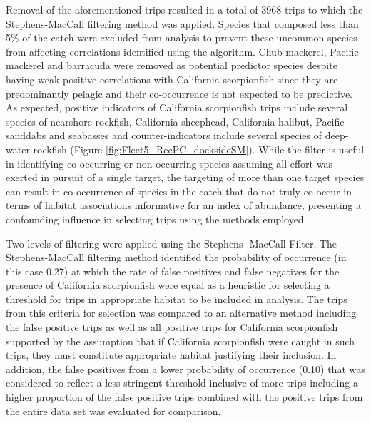 \documentclass[12pt,]{article}
\begin{document}
Removal of the aforementioned trips resulted in a total of 3968 trips to
which the Stephens-MacCall filtering method was applied. Species that
composed less than 5\% of the catch were excluded from analysis to
prevent these uncommon species from affecting correlations identified
using the algorithm. Chub mackerel, Pacific mackerel and barracuda were
removed as potential predictor species despite having weak positive
correlations with California scorpionfish since they are predominantly
pelagic and their co-occurrence is not expected to be predictive. As
expected, positive indicators of California scorpionfish trips include
several species of nearshore rockfish, California sheephead, California
halibut, Pacific sanddabs and seabasses and counter-indicators include
several species of deep-water rockfish (Figure
\ref{fig:Fleet5_RecPC_docksideSM}). While the filter is useful in
identifying co-occurring or non-occurring species assuming all effort
was exerted in pursuit of a single target, the targeting of more than
one target species can result in co-occurrence of species in the catch
that do not truly co-occur in terms of habitat associations informative
for an index of abundance, presenting a confounding influence in
selecting trips using the methods employed.

Two levels of filtering were applied using the Stephens- MacCall Filter.
The Stephens-MacCall filtering method identified the probability of
occurrence (in this case 0.27) at which the rate of false positives and
false negatives for the presence of California scorpionfish were equal
as a heuristic for selecting a threshold for trips in appropriate
habitat to be included in analysis. The trips from this criteria for
selection was compared to an alternative method including the false
positive trips as well as all positive trips for California scorpionfish
supported by the assumption that if California scorpionfish were caught
in such trips, they must constitute appropriate habitat justifying their
inclusion. In addition, the false positives from a lower probability of
occurrence (0.10) that was considered to reflect a less stringent
threshold inclusive of more trips including a higher proportion of the
false positive trips combined with the positive trips from the entire
data set was evaluated for comparison.
\end{document}
